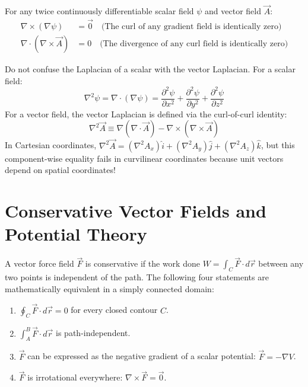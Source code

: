 \begin{maththeorem}
For any twice continuously differentiable scalar field $\psi$ and vector field $\vec{A}$:
\begin{align}
\nabla \times (\nabla \psi) &= \vec{0} \quad \text{(The curl of any gradient field is identically zero)} \\
\nabla \cdot (\nabla \times \vec{A}) &= 0 \quad \text{(The divergence of any curl field is identically zero)}
\end{align}
\end{maththeorem}

\begin{pitfallbox}
Do not confuse the Laplacian of a scalar with the vector Laplacian. 
For a scalar field:
\begin{equation}
\nabla^2 \psi = \nabla \cdot (\nabla \psi) = \frac{\partial^2 \psi}{\partial x^2} + \frac{\partial^2 \psi}{\partial y^2} + \frac{\partial^2 \psi}{\partial z^2}
\end{equation}
For a vector field, the vector Laplacian is defined via the curl-of-curl identity:
\begin{equation}
\nabla^2 \vec{A} \equiv \nabla(\nabla \cdot \vec{A}) - \nabla \times (\nabla \times \vec{A})
\end{equation}
In Cartesian coordinates, $\nabla^2 \vec{A} = (\nabla^2 A_x)\hat{i} + (\nabla^2 A_y)\hat{j} + (\nabla^2 A_z)\hat{k}$, but this component-wise equality fails in curvilinear coordinates because unit vectors depend on spatial coordinates!
\end{pitfallbox}

\section{Conservative Vector Fields and Potential Theory}
A vector force field $\vec{F}$ is conservative if the work done $W = \int_{C} \vec{F} \cdot d\vec{r}$ between any two points is independent of the path. The following four statements are mathematically equivalent in a simply connected domain:
\begin{enumerate}
    \item $\oint_C \vec{F} \cdot d\vec{r} = 0$ for every closed contour $C$.
    \item $\int_A^B \vec{F} \cdot d\vec{r}$ is path-independent.
    \item $\vec{F}$ can be expressed as the negative gradient of a scalar potential: $\vec{F} = -\nabla V$.
    \item $\vec{F}$ is irrotational everywhere: $\nabla \times \vec{F} = \vec{0}$.
\end{enumerate}

